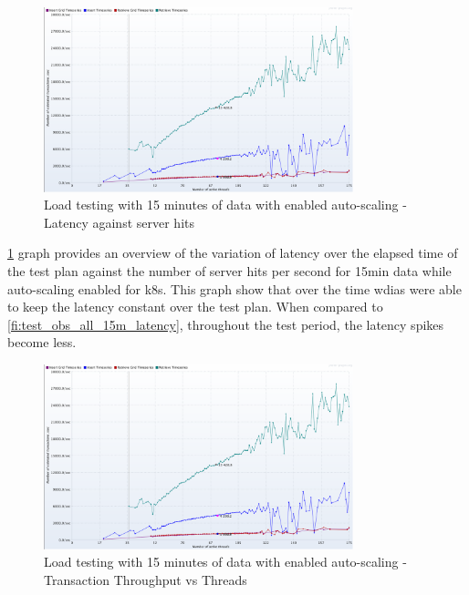 \begin{figure}[htp]
    \centering
    \includegraphics[width=0.8\textwidth]{results/obs/all_auto/obs_all_auto_15m_transaction_throughtput_vs_threads.png}
    \caption{Load testing with 15 minutes of data with enabled auto-scaling - Latency against server hits}
    \label{fi:test_obs_all_auto_15m_latency}
\end{figure}
\cref{fi:test_obs_all_auto_15m_latency} graph provides an overview of the variation of latency over the elapsed time of the test plan against the number of server hits per second for 15min data while auto-scaling enabled for \acrshort{k8s}.
This graph show that over the time \acrshort{wdias} were able to keep the latency constant over the test plan.
When compared to \cref{fi:test_obs_all_15m_latency}, throughout the test period, the latency spikes become less.

\begin{figure}[htp]
    \centering
    \includegraphics[width=0.8\textwidth]{results/obs/all_auto/obs_all_auto_15m_transaction_throughtput_vs_threads.png}
    \caption{Load testing with 15 minutes of data with enabled auto-scaling - Transaction Throughput vs Threads}
    \label{fi:test_obs_all_auto_15m_throughtput}
\end{figure}

